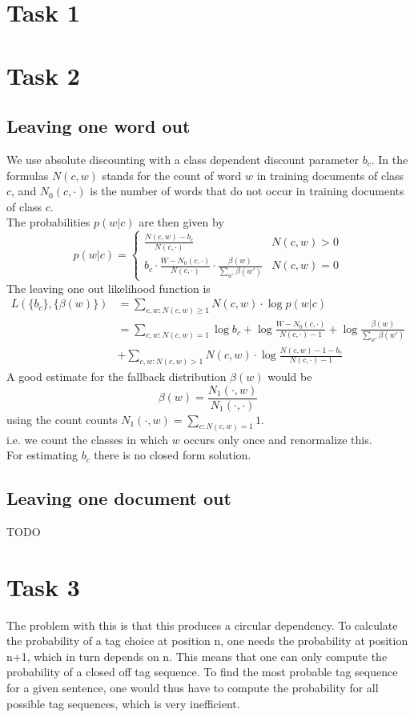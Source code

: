\documentclass[%
   11pt,              %
   ngerman,           %
   a4paper,           %
   DIV11,             %
]{scrartcl}%
\begin{document}
\section*{Task 1}
\section*{Task 2}
\subsection*{Leaving one word out}
We use absolute discounting with a class dependent discount parameter $b_c$. In the formulas $N(c,w)$ stands for the count of word $w$ in training documents of class $c$, and $N_0(c, \cdot)$ is the number of words that do not occur in training documents of class $c.$\\
The probabilities $p(w|c)$ are then given by
\begin{equation*}
	p(w|c) = 
	\begin{cases}
		\frac{N(c,w) - b_c}{N(c, \cdot)} & N(c,w) > 0 \\
		b_c \cdot \frac{W - N_0(c, \cdot)}{N(c, \cdot)} \cdot \frac{\beta(w)}{\sum_{w'}\beta(w')} & N(c,w) = 0
	\end{cases}
\end{equation*}
The leaving one out likelihood function is
\begin{align*}
	L(\{b_c\},\{\beta(w)\}) &= \sum_{c,w: N(c,w) \geq 1}N(c,w) \cdot \log p(w|c) \\
	&= \sum_{c,w: N(c,w) = 1}\log b_c + \log \frac{W - N_0(c, \cdot)}{N(c,\cdot) - 1} + \log \frac{\beta(w)}{\sum_{w'}\beta(w')} \\
	&+ \sum_{c,w: N(c,w) > 1}N(c,w) \cdot \log \frac{N(c,w) - 1 - b_c}{N(c,\cdot) - 1}
\end{align*}
A good estimate for the fallback distribution $\beta(w)$ would be
\begin{equation*}
	\beta(w) = \frac{N_1(\cdot, w)}{N_1(\cdot, \cdot)}
\end{equation*}
using the count counts $N_1(\cdot, w) = \sum_{c: N(c,w) = 1} 1$.\\
i.e. we count the classes in which $w$ occurs only once and renormalize this. \\
For estimating $b_c$ there is no closed form solution.
\subsection*{Leaving one document out}
TODO
\section*{Task 3}
The problem with this is that this produces a circular dependency. To calculate the probability of a tag choice at position n, one needs the probability at position n+1, which in turn depends on n. This means that one can only compute the probability of a closed off tag sequence. To find the most probable tag sequence for a given sentence, one would thus have to compute the probability for all possible tag sequences, which is very inefficient.
\end{document}
